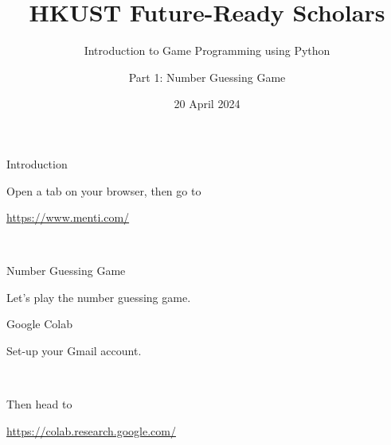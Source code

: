 \documentclass[dvipsnames, svgnames, x11names]{beamer}
\title[HKUST Future-Ready Scholars]{HKUST Future-Ready Scholars}
\subtitle{Introduction to Game Programming using Python}
\author[Game Programming using Python]{Part 1: Number Guessing Game}
\date[April 2024]{20 April 2024}
\begin{document}

\frame{\titlepage}

\begin{frame}[fragile]{Introduction}
    \begin{center}
        Open a tab on your browser, then go to

        \href{https://www.menti.com/}{https://www.menti.com/}

        \

    \end{center}
\end{frame}

\begin{frame}[fragile]{Number Guessing Game}
    \begin{center}
        Let's play the number guessing game.
    \end{center}
\end{frame}

\begin{frame}[fragile]{Google Colab}
    \begin{center}
        Set-up your Gmail account.

        \

        Then head to

        \href{https://colab.research.google.com/}{https://colab.research.google.com/}
    \end{center}
\end{frame}
\end{document}

